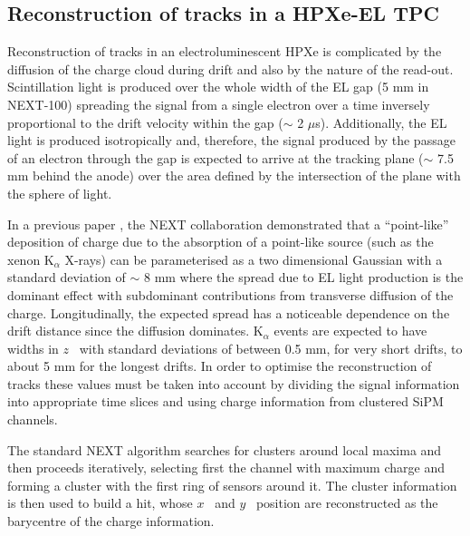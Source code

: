\documentclass[a4paper,11pt]{article}
\begin{document}
\subsection{Reconstruction of tracks in a HPXe-EL TPC}
Reconstruction of tracks in an electroluminescent HPXe is complicated by the diffusion of the charge cloud during drift and also by the nature of the read-out. Scintillation light is produced over the whole width of the EL gap (5 mm in NEXT-100) spreading the signal from a single electron over a time inversely proportional to the drift velocity within the gap ($\sim$ 2 $\mu$s). Additionally, the EL light is produced isotropically and, therefore, the signal produced by the passage of an electron through the gap is expected to arrive at the tracking plane ($\sim$ 7.5 mm behind the anode) over the area defined by the intersection of the plane with the sphere of light.

In a previous paper \cite{Lorca:2014sra}, the NEXT collaboration demonstrated that a ``point-like''
deposition of charge due to the absorption of a point-like source (such as the xenon K$_\alpha$ X-rays) can be parameterised as a two dimensional Gaussian with a standard deviation of $\sim$ 8 mm where the spread due to EL light production is the dominant effect with subdominant contributions from transverse diffusion of the charge. Longitudinally, the expected spread has a noticeable dependence on the drift distance since the diffusion dominates. K$_\alpha$ events are expected to have widths in $z$~ with standard deviations of between 0.5 mm, for very short drifts, to about 5 mm for the longest drifts. In order to optimise the reconstruction of tracks these values must be taken into account by dividing the signal information into appropriate time slices and using charge information from clustered SiPM channels.

The standard NEXT algorithm  searches for clusters around local maxima and then proceeds iteratively, selecting first the channel with maximum charge and forming a cluster with the first ring of sensors around it. The cluster information is then used to build a hit, whose $x$~ and $y$~ position are reconstructed as the barycentre of the charge information. 
\end{document}
